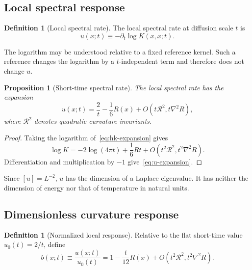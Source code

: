 \documentclass[12pt,a4paper]{article}
\newtheorem{proposition}[theorem]{Proposition}
\theoremstyle{definition}
\newtheorem{definition}[theorem]{Definition}
\newcommand{\hk}{K}
\begin{document}
    \subsection{Local spectral response}

      \begin{definition}[Local spectral rate]
        \label{def:u}
        The local spectral rate at diffusion scale $t$ is
        \begin{equation}
          u(x;t)\equiv-\partial_t\log\hk(x,x;t).
          \label{eq:u-def}
        \end{equation}
      \end{definition}

      The logarithm may be understood relative to a fixed reference kernel.
      Such a reference changes the logarithm by a $t$-independent term and therefore does not change $u$.

      \begin{proposition}[Short-time spectral rate]
        \label{prop:u-expansion}
        The local spectral rate has the expansion
        \begin{equation}
          u(x;t)
          =\frac{2}{t}-\frac{1}{6}R(x)
          +O\!\left(t\mathcal{R}^2,t\nabla^2R\right),
          \label{eq:u-expansion}
        \end{equation}
        where $\mathcal{R}^2$ denotes quadratic curvature invariants.
      \end{proposition}

      \begin{proof}
        Taking the logarithm of~\eqref{eq:hk-expansion} gives
        \[
          \log\hk=-2\log(4\pi t)+\frac{1}{6}Rt
          +O\!\left(t^2\mathcal{R}^2,t^2\nabla^2R\right).
        \]
        Differentiation and multiplication by $-1$ give~\eqref{eq:u-expansion}.
      \end{proof}

      Since $[u]=L^{-2}$, $u$ has the dimension of a Laplace eigenvalue.
      It has neither the dimension of energy nor that of temperature in natural units.

    \subsection{Dimensionless curvature response}

      \begin{definition}[Normalized local response]
        \label{def:beta}
        Relative to the flat short-time value $u_0(t)=2/t$, define
        \begin{equation}
          b(x;t)
          \equiv
          \frac{u(x;t)}{u_0(t)}
          =1-\frac{t}{12}R(x)
          +O\!\left(t^2\mathcal{R}^2,t^2\nabla^2R\right).
          \label{eq:beta-def}
        \end{equation}
      \end{definition}
\end{document}
